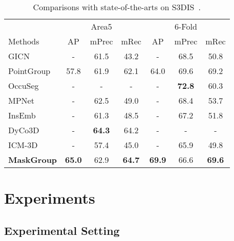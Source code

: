 \documentclass{article}
\begin{document}
\begin{table}[tb]
	\begin{center}
		\small
		\setlength{\tabcolsep}{1.4mm}
		\caption{{Comparisons with state-of-the-arts on S3DIS}~\cite{s3dis}.}		\begin{tabular}{ l  |c c c | c c c}
				\toprule
				&  & Area5 &  & & 6-Fold &  \\
				Methods  & AP & mPrec & mRec  & AP & mPrec & mRec \\
				\midrule
				GICN~\cite{gicn}  & - & 61.5 & 43.2 & - & 68.5 & 50.8 \\
				PointGroup~\cite{pointgroup}  &{57.8} & {61.9} & {62.1} &{64.0} &{69.6} & {69.2} \\
				OccuSeg~\cite{occseg}  &- &- &- &- &\textbf{72.8} &60.3 \\
				MPNet~\cite{he2020learning} &- &62.5 &49.0 &- &68.4 &53.7 \\			
				InsEmb~\cite{he2020instance}  &- &61.3 &48.5 &- &67.2 &51.8\\				
				DyCo3D~\cite{dyco} &- &\textbf{64.3} &64.2 &-&-&- \\
				ICM-3D~\cite{chu2021icm} &- &57.4 &45.0 &-&65.9&49.8 \\
				\hline
				\bf {MaskGroup}  & \textbf{65.0} &{62.9} &\textbf{64.7} &\textbf{69.9} &66.6 &\textbf{69.6} \\
				\bottomrule
			\end{tabular}
		\label{tab:s3dis-compare}
	\end{center}
	\vspace{-8mm}
\end{table}

\section{Experiments}

\subsection{Experimental Setting}
\end{document}
